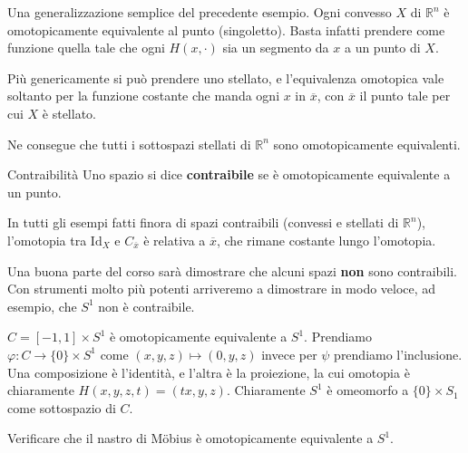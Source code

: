 \begin{example}
    Una generalizzazione semplice del precedente esempio. Ogni convesso \(X\) di
    \(\mathbb{R}^{n}\) è omotopicamente equivalente al punto (singoletto). Basta
    infatti prendere come funzione quella tale che ogni \(H(x, \cdot )\) sia un
    segmento da \(x\) a un punto di \(X\).

    Più genericamente si può prendere uno stellato, e l'equivalenza omotopica
    vale soltanto per la funzione costante che manda ogni \(x\) in
    \(\overline{x}\), con \(\overline{x}\) il punto tale per cui \(X\) è
    stellato. 

    Ne consegue che tutti i sottospazi stellati di \(\mathbb{R}^{n}\) sono
    omotopicamente equivalenti.
\end{example}
\begin{definition}{Contraibilità}
    Uno spazio si dice \textbf{contraibile} se è omotopicamente equivalente a un
    punto.
\end{definition}
\begin{note}
    In tutti gli esempi fatti finora di spazi contraibili (convessi e stellati
    di \(\mathbb{R}^{n}\)), l'omotopia tra \(\mathrm{Id}_X\) e
    \(C_{\overline{x}} \) è relativa a \(\overline{x}\), che rimane costante
    lungo l'omotopia.
\end{note}

Una buona parte del corso sarà dimostrare che alcuni spazi \textbf{non} sono
contraibili. Con strumenti molto più potenti arriveremo a dimostrare in modo
veloce, ad esempio, che \(S^{1}\) non è contraibile. 

\begin{example}
    \(C = [-1, 1] \times S^{1}\)  è omotopicamente equivalente a \(S^{1}\).
    Prendiamo \(\varphi : C \to \{0\} \times S^{1}\) come \({(x, y, z)} \mapsto
    (0, y, z)\) invece per \(\psi\) prendiamo l'inclusione. Una composizione è
    l'identità, e l'altra è la proiezione, la cui omotopia è chiaramente \(H(x,
    y, z, t) = (tx, y, z)\). Chiaramente \(S^{1}\) è omeomorfo a \(\{0\} \times
    S_{1}\) come sottospazio di \(C\).
\end{example}

\begin{eser}
    Verificare che il nastro di Möbius è omotopicamente equivalente a \(S^{1}\).

    \tcblower

\end{eser}

